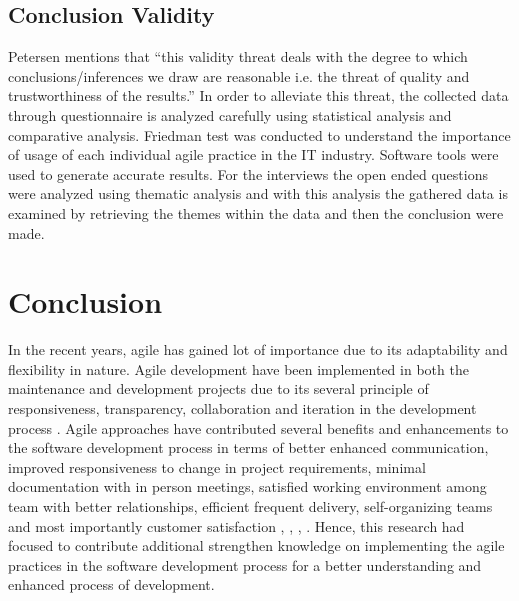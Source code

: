 \documentclass[a4paper,oneside]{bth}
\begin{document}
\subsection{Conclusion Validity}
Petersen \cite{petersen_worldviews_2013} mentions that “this validity threat deals with the degree to which conclusions/inferences we draw are reasonable i.e. the threat of quality and trustworthiness of the results.” In order to alleviate this threat, the collected data through questionnaire is analyzed carefully using statistical analysis and comparative analysis. Friedman test was conducted to understand the importance of usage of each individual agile practice in the IT industry. Software tools were used to generate accurate results. For the interviews the open ended questions were analyzed using thematic analysis and with this analysis the gathered data is examined by retrieving the themes within the data and then the conclusion were made.

\section{Conclusion}
In the recent years, agile has gained lot of importance due to its adaptability and flexibility in nature. Agile development have been implemented in both the maintenance and development projects due to its several principle of responsiveness, transparency, collaboration and iteration in the development process \cite{jigeesh_empirical_2015}. Agile approaches have contributed several benefits and enhancements to the software development process in terms of better enhanced communication, improved responsiveness to change in project requirements, minimal documentation with in person meetings, satisfied working environment among team with better relationships, efficient frequent delivery, self-organizing teams and most importantly customer satisfaction \cite{jigeesh_empirical_2015}, \cite{begel_usage_2007}, \cite{solinski_prioritizing_2014}, \cite{moniruzzaman_comparative_2013}. Hence, this research had focused to contribute additional strengthen knowledge on implementing the agile practices in the software development process for a better understanding and enhanced process of development. 
\end{document}
